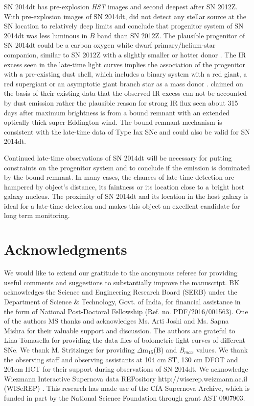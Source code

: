 \documentclass[fleqn,usenatbib]{mnras}
\begin{document}
 SN 2014dt has pre-explosion {\it HST} images and second deepest after SN 2012Z. With pre-explosion images of SN 2014dt, \cite{2015ApJ...798L..37F} did not detect any stellar source at the SN location to relatively deep limits and conclude that progenitor system of SN 2014dt was less luminous in $B$ band than SN 2012Z. The plausible progenitor of SN 2014dt could be a carbon oxygen white dwarf primary/helium-star companion, similar to SN 2012Z with a slightly smaller or hotter donor \citep{2015ApJ...798L..37F}. The IR excess seen in the late-time light curves implies the association of the progenitor with a pre-existing dust shell, which includes a binary system with a red giant, a red supergiant or an asymptotic giant branch star as a mass donor \citep{2016ApJ...816L..13F}. \cite{2016MNRAS.461..433F} claimed on the basis of their existing data that the observed IR excess can not be accounted by dust emission rather the plausible reason for strong IR flux seen about 315 days after maximum brightness is from a bound remnant with an extended optically thick super-Eddington wind. The bound remnant mechanism is consistent with the late-time data of Type Iax SNe and could also be valid for SN 2014dt.

Continued late-time observations of SN 2014dt will be necessary for putting constraints on the progenitor system and to conclude if the emission is dominated by the bound remnant. In many cases, the chances of late-time detection are hampered by object's distance, its faintness or its location close to a bright host galaxy nucleus. The proximity of SN 2014dt and its location in the host galaxy is ideal for a late-time detection and makes this object an excellent candidate for long term monitoring.

\section*{Acknowledgments}

We would like to extend our gratitude to the anonymous referee for providing useful comments and suggestions to substantially improve the manuscript. BK acknowledges the Science and Engineering Research Board (SERB) under the Department of Science \& Technology, Govt. of India, for financial assistance in the form of National Post-Doctoral Fellowship (Ref. no. PDF/2016/001563). One of the authors MS thanks and acknowledges Ms. Arti Joshi and Ms. Sapna Mishra for their valuable support and discussion. The authors are grateful to Lina Tomasella for providing the data files of bolometric light curves of different SNe. We thank M. Stritzinger for providing $\Delta$m$_{15}$(B) and {\it B}$_{max}$ values. 
We thank the observing staff and observing assistants at 104 cm ST, 130 cm DFOT and 201cm HCT for their support during observations of SN 2014dt. We acknowledge Wiezmann Interactive Supernova data REPository http://wiserep.weizmann.ac.il (WISeREP) \citep{2012PASP..124..668Y}. This research has made use of the CfA Supernova Archive, which is funded in part by the National Science Foundation through grant AST 0907903. 
\end{document}
